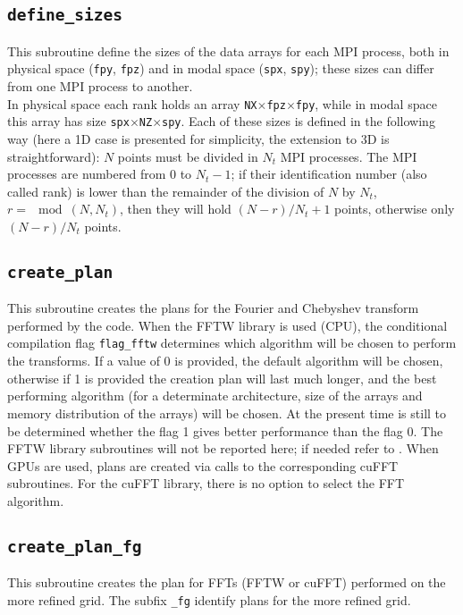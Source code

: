 \subsection{\texttt{define\_sizes}}
This subroutine define the sizes of the data arrays for each MPI process, both in physical space (\texttt{fpy}, \texttt{fpz}) and in modal space (\texttt{spx}, \texttt{spy}); these sizes can differ from one MPI process to another.\\
In physical space each rank holds an array \texttt{NX}$\times$\texttt{fpz}$\times$\texttt{fpy}, while in modal space this array has size \texttt{spx}$\times$\texttt{NZ}$\times$\texttt{spy}. Each of these sizes is defined in the following way (here a 1D case is presented for simplicity, the extension to 3D is straightforward): $N$ points must be divided in $N_t$ MPI processes. The MPI processes are numbered from 0 to $N_t-1$; if their identification number (also called rank) is lower than the remainder of the division of $N$ by $N_t$, $r=\mod(N,N_t)$, then they will hold $(N-r)/N_t+1$ points, otherwise only $(N-r)/N_t$ points.

\subsection{\texttt{create\_plan}}
This subroutine creates the plans for the Fourier and Chebyshev transform performed by the code. 
When the FFTW library is used (CPU), the conditional compilation flag \texttt{flag\_fftw} determines which algorithm will be chosen to perform the transforms. 
If a value of 0 is provided, the default algorithm will be chosen, otherwise if 1 is provided the creation plan will last much longer, and the best performing algorithm (for a determinate architecture, size of the arrays and memory distribution of the arrays) will be chosen. 
At the present time is still to be determined whether the flag 1 gives better performance than the flag 0. 
The FFTW library subroutines will not be reported here; if needed refer to \cite{fftw}.
When GPUs are used, plans are created via calls to the corresponding cuFFT subroutines.
For the cuFFT library, there is no option to select the FFT algorithm. 

\subsection{\texttt{create\_plan\_fg}}
This subroutine creates the plan for FFTs (FFTW or cuFFT) performed on the more refined grid.
The subfix \texttt{\_fg} identify plans for the more refined grid.

